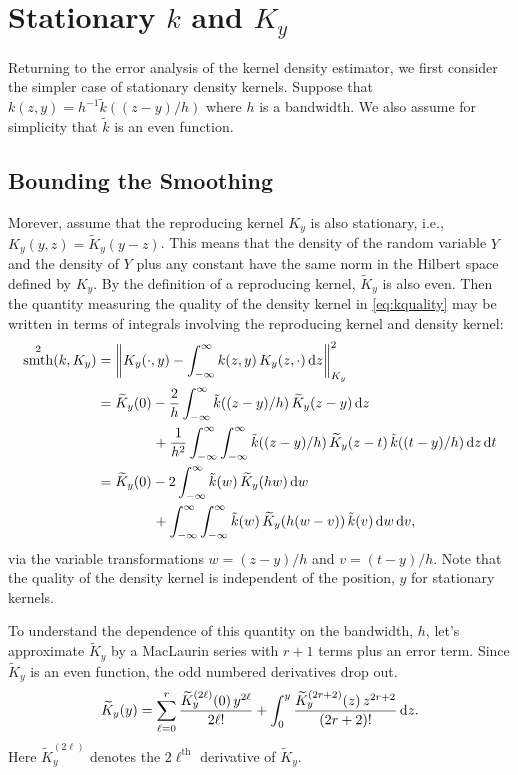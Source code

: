 \documentclass[letterpaper]{amsart}
\newcommand{\KY}{K_y}
\newcommand{\tKY}{\widetilde{K}_y}
\newcommand{\tk}{\tilde{k}}
\DeclareMathOperator{\smooth}{smth}
\begin{document}

\section{Stationary $k$ and $\KY$}

Returning to the error analysis of the kernel density estimator, we first consider the simpler case of stationary density kernels.  Suppose that $k(z,y) = h^{-1}\tk((z-y)/h)$ where $h$ is a bandwidth. We also assume for simplicity that $\tk$ is an even function.

\subsection{Bounding the Smoothing} Morever, assume that the reproducing kernel $\KY$ is also stationary, i.e., $\KY(y,z) = \tKY(y-z)$. This means that the density of the random variable $Y$ and the density of $Y$ plus any constant have the same norm in the Hilbert space defined by $\KY$.  By the definition of a reproducing kernel, $\tKY$ is also even. Then the quantity measuring the quality of the density kernel in \eqref{eq:kquality} may be written in terms of integrals involving the reproducing kernel and density kernel:
\begin{align*}
	\smooth^2(k,\KY) & = \norm[\KY]{\KY(\cdot,y) - \int_{-\infty}^{\infty} k(z,y) \, \KY(z,\cdot) \, \dif z}^2 \\
	&=  \tKY(0) -  \frac 2h \int_{-\infty}^{\infty} \tk((z-y)/h) \, \tKY(z-y) \, \dif z \\
	& \qquad \qquad + \frac 1{h^2} \int_{-\infty}^{\infty} \int_{-\infty}^{\infty}  \tk((z-y)/h)  \, \tKY(z-t) \, \tk((t-y)/h) \, \dif z \, \dif t \\
	&=   \tKY(0) - 2 \int_{-\infty}^{\infty} \tk(w) \, \tKY(hw) \, \dif w \\
	& \qquad \qquad + \int_{-\infty}^{\infty} \int_{-\infty}^{\infty}  \tk(w) \, \tKY(h(w-v)) \, \tk(v)\, \dif w \, \dif v,
\end{align*}
via the variable transformations $w = (z-y)/h$ and $v = (t-y)/h$. Note that the quality of the density kernel is independent of the position, $y$ for stationary kernels.

To understand the dependence of this quantity on the bandwidth, $h$, let's approximate $\tKY$ by a MacLaurin series with $r+1$ terms plus an error term.  Since $\tKY$ is an even function, the odd numbered derivatives drop out.
\begin{equation*}
	\tKY(y)  = \sum_{\ell = 0}^{r} \frac{\tKY^{(2\ell)}(0) \, y^{2\ell}}{2\ell!} + \int_0^y \frac{\tKY^{(2r+2)}(z) \,  z^{2r+2}}{(2r+2)!} \, \dif z.
\end{equation*}
Here $\tKY^{(2\ell)}$ denotes the $2\ell^{\text{th}}$ derivative of $\tKY$.
\end{document}
